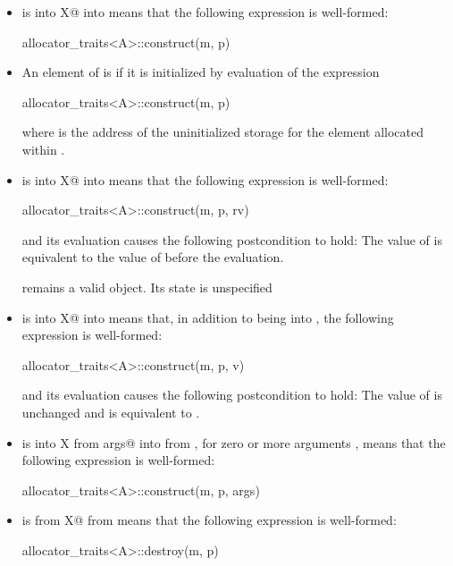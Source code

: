 \begin{itemize}
\item
{} is 
{ into X@ into }
means that the following expression is well-formed:
\begin{codeblock}
allocator_traits<A>::construct(m, p)
\end{codeblock}

\item
An element of  is  if it is initialized
by evaluation of the expression
\begin{codeblock}
allocator_traits<A>::construct(m, p)
\end{codeblock}
where  is the address of the uninitialized storage for the element
allocated within .

\item
{} is 
{ into X@ into }
means that the following expression
is well-formed:
\begin{codeblock}
allocator_traits<A>::construct(m, p, rv)
\end{codeblock}
and its evaluation causes the following postcondition to hold: The value
of  is equivalent to the value of  before the evaluation.
\begin{note}
 remains a valid object. Its state is unspecified
\end{note}

\item
{} is 
{ into X@ into }
means that, in addition to  being  into
, the following expression is well-formed:
\begin{codeblock}
allocator_traits<A>::construct(m, p, v)
\end{codeblock}
and its evaluation causes the following postcondition to hold:
The value of  is unchanged and is equivalent to .

\item
{} is
{ into X from args@ into  from },
for zero
or more arguments , means that the following expression is well-formed:
\begin{codeblock}
allocator_traits<A>::construct(m, p, args)
\end{codeblock}

\item
{} is
{ from X@ from }
means that the following expression is well-formed:
\begin{codeblock}
allocator_traits<A>::destroy(m, p)
\end{codeblock}
\end{itemize}

